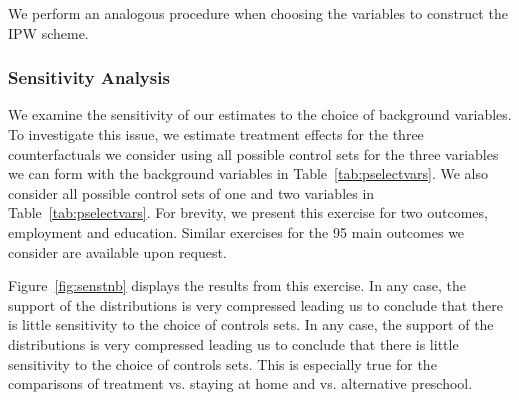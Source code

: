 \noindent We perform an analogous procedure when choosing the variables to construct the IPW scheme.

\subsubsection{Sensitivity Analysis} \label{app:senscontrols}

\noindent We examine the sensitivity of our estimates to the choice of background variables. To investigate this issue, we estimate treatment effects for the three counterfactuals we consider using all possible control sets for the three variables we can form with the background variables in Table~\ref{tab:pselectvars}. We also consider all possible control sets of one and two variables in Table~\ref{tab:pselectvars}. For brevity, we present this exercise for two outcomes, employment and education. Similar exercises for the 95 main outcomes we consider are available upon request.

\noindent Figure~\ref{fig:senstnb} displays the results from this exercise. In any case, the support of the distributions is very compressed leading us to conclude that there is little sensitivity to the choice of controls sets. In any case, the support of the distributions is very compressed leading us to conclude that there is little sensitivity to the choice of controls sets. This is especially true for the comparisons of treatment vs. staying at home and vs. alternative preschool.

